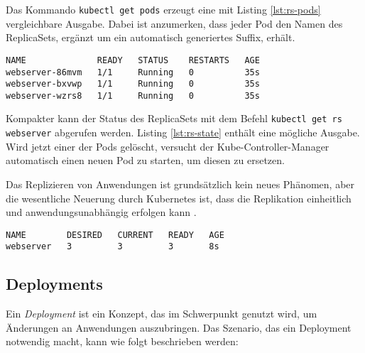 \documentclass[11pt,a4paper]{article}
\begin{document}


Das Kommando \lstinline|kubectl get pods| erzeugt eine mit Listing \ref{lst:rs-pods}
vergleichbare Ausgabe. Dabei ist anzumerken, dass jeder Pod den Namen des ReplicaSets,
ergänzt um ein automatisch generiertes Suffix, erhält.

\begin{lstlisting}[caption={Drei Pods wurden erfolgreich gestartet.}, label={lst:rs-pods}]
NAME              READY   STATUS    RESTARTS   AGE
webserver-86mvm   1/1     Running   0          35s
webserver-bxvwp   1/1     Running   0          35s
webserver-wzrs8   1/1     Running   0          35s
\end{lstlisting}

Kompakter kann der Status des ReplicaSets mit dem Befehl \lstinline|kubectl get rs webserver|
abgerufen werden. Listing \ref{lst:rs-state} enthält eine mögliche Ausgabe.
Wird jetzt einer der Pods gelöscht, versucht der Kube-Controller-Manager automatisch
einen neuen Pod zu starten, um diesen zu ersetzen.

Das Replizieren von Anwendungen ist grundsätzlich kein neues Phänomen, aber
die wesentliche Neuerung durch Kubernetes ist, dass die Replikation einheitlich
und anwendungsunabhängig erfolgen kann \cite{Schmeling_Dargatz_2022}.

\begin{lstlisting}[caption={Ein ReplicaSet mit drei erfolgreich gestarteten Instanze.}, label={lst:rs-state}]
NAME        DESIRED   CURRENT   READY   AGE
webserver   3         3         3       8s
\end{lstlisting}

\subsection{Deployments}
Ein \emph{Deployment} ist ein Konzept, das im Schwerpunkt genutzt wird, um Änderungen an Anwendungen auszubringen.
Das Szenario, das ein Deployment notwendig macht, kann wie folgt beschrieben werden:
\end{document}
